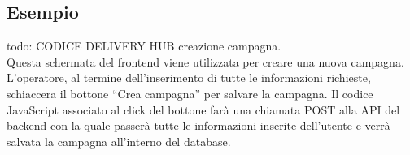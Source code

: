 \subsection{Esempio}
todo: CODICE DELIVERY HUB creazione campagna.\\

Questa schermata del frontend viene utilizzata per creare una nuova campagna.
L’operatore, al termine dell’inserimento di tutte le informazioni richieste, 
schiaccera il bottone “Crea campagna” per salvare la campagna.
Il codice JavaScript associato al click del bottone farà una chiamata POST 
alla API del backend con la quale passerà tutte le informazioni inserite 
dell’utente e verrà salvata la campagna all’interno del database.

